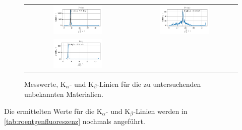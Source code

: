 \documentclass[ngerman]{scrartcl}
\begin{document}
\begin{figure}[H]
    \centering
    \begin{tabular}{cc}
        \includegraphics[width=0.48\textwidth]{../plots/roentgen_data_9.pdf}  &
        \includegraphics[width=0.48\textwidth]{../plots/roentgen_data_10.pdf}   \\
        \includegraphics[width=0.48\textwidth]{../plots/roentgen_data_11.pdf} & \\
    \end{tabular}
    \caption[Messwerte unbekannter Proben]{Messwerte, K$_{\alpha}$- und K$_{\beta}$-Linien für die zu untersuchenden unbekannten Materialien.}
    \label{fig:roentgenfluoreszenz2}
\end{figure}
%
Die ermittelten Werte für die K$_{\alpha}$- und K$_{\beta}$-Linien werden in \autoref{tab:roentgenfluoreszenz} nochmals angeführt.
%
\end{document}
